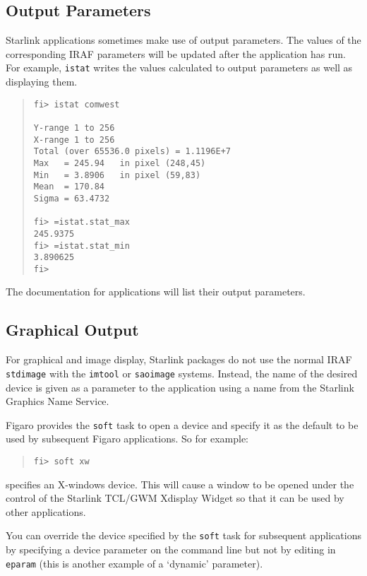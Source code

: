 \documentclass[twoside,11pt]{article}
\newcommand{\htmlref}[2]{#1}
\newcommand{\xref}[3]{#1}
\newcommand{\xlabel}[1]{}
\begin{document}
\subsection{\xlabel{output_parameters}Output Parameters}
Starlink applications sometimes make use of output parameters. 
The values of the corresponding IRAF parameters will be updated after the 
application has run. For example, \texttt{istat} writes the values calculated 
to output parameters as well as displaying them.
\begin{quote} \begin{verbatim}
fi> istat comwest

Y-range 1 to 256
X-range 1 to 256
Total (over 65536.0 pixels) = 1.1196E+7
Max   = 245.94   in pixel (248,45)
Min   = 3.8906   in pixel (59,83)
Mean  = 170.84
Sigma = 63.4732

fi> =istat.stat_max
245.9375
fi> =istat.stat_min
3.890625
fi>
\end{verbatim} \end{quote}
The documentation for applications will list their output parameters.

\subsection{\xlabel{graphical_output}Graphical Output}
For graphical and image display, Starlink packages do not use the normal IRAF
\texttt{stdimage} with the \texttt{imtool} or \texttt{saoimage} systems. 
Instead, the name of the desired device is given as a parameter to the 
application using a name from the Starlink
\xref{Graphics Name Service}{sun57}{}.

Figaro provides the \texttt{soft} task to open a device and specify it as the
default to be used by subsequent Figaro applications. So for example:
\begin{quote} \begin{verbatim}
fi> soft xw
\end{verbatim} \end{quote}
specifies an X-windows device. This will cause a window to be opened under the
control of the Starlink
\xref{TCL/GWM Xdisplay Widget}{sun219}{}
so that it can be used by other applications.

You can override the device specified by the \texttt{soft} task for subsequent
applications by specifying a device parameter on the command line but not
by editing in \texttt{eparam} (this is another example of a 
\htmlref{`dynamic'}{dynamic_parameters}
parameter).
\end{document}
